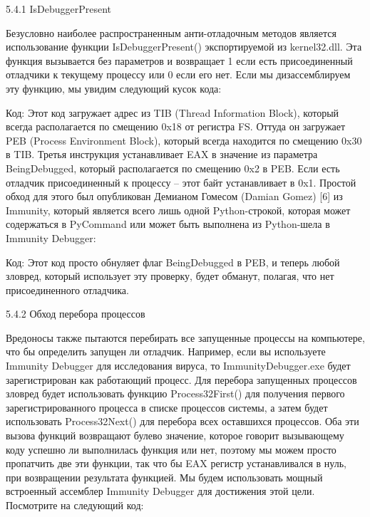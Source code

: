 \documentclass[12pt, a4paper, oneside]{book}
\begin{document}
5.4.1 IsDebuggerPresent

Безусловно наиболее распространенным анти-отладочным методов является использование функции IsDebuggerPresent() экспортируемой из kernel32.dll. Эта функция вызывается без параметров и возвращает 1 если есть присоединенный отладчики к текущему процессу или 0 если его нет. Если мы дизассемблируем эту функцию, мы увидим следующий кусок кода:

Код:
Этот код загружает адрес из TIB (Thread Information Block), который всегда располагается по смещению 0x18 от регистра FS. Оттуда он загружает PEB (Process Environment Block), который всегда находится по смещению 0x30 в TIB. Третья инструкция устанавливает EAX в значение из параметра BeingDebugged, который располагается по смещению 0x2 в PEB. Если есть отладчик присоединенный к процессу – этот байт устанавливает в 0x1. Простой обход для этого был опубликован Демианом Гомесом (Damian Gomez) [6] из Immunity, который является всего лишь одной Python-строкой, которая может содержаться в PyCommand или может быть выполнена из Python-шела в Immunity Debugger:

Код:
Этот код просто обнуляет флаг BeingDebugged в PEB, и теперь любой зловред, который использует эту проверку, будет обманут, полагая, что нет присоединенного отладчика. 

5.4.2 Обход перебора процессов

Вредоносы также пытаются перебирать все запущенные процессы на компьютере, что бы определить запущен ли отладчик. Например, если вы используете Immunity Debugger для исследования вируса, то ImmunityDebugger.exe будет зарегистрирован как работающий процесс. Для перебора запущенных процессов зловред будет использовать функцию Process32First() для получения первого зарегистрированного процесса в списке процессов системы, а затем будет использовать Process32Next() для перебора всех оставшихся процессов. Оба эти вызова функций возвращают булево значение, которое говорит вызывающему коду успешно ли выполнилась функция или нет, поэтому мы можем просто пропатчить две эти функции, так что бы EAX регистр устанавливался в нуль, при возвращении результата функцией. Мы будем использовать мощный встроенный ассемблер Immunity Debugger для достижения этой цели. Посмотрите на следующий код:
\end{document}
